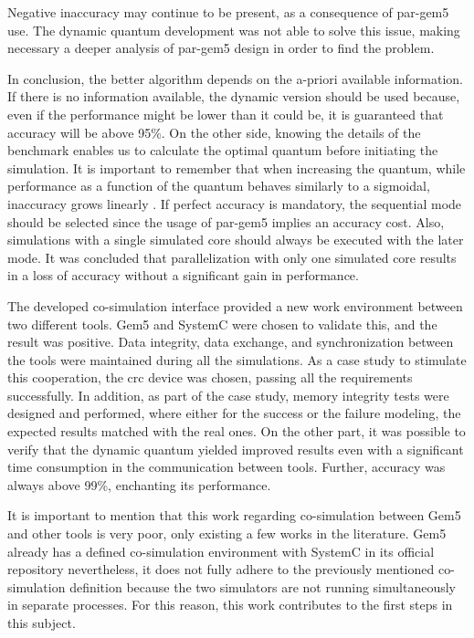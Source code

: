 Negative inaccuracy may continue to be present, as a consequence of par-gem5 use. The dynamic quantum development was not able to solve this
issue, making necessary a deeper analysis of par-gem5 design in order to find the problem. 

In conclusion, the better algorithm depends on the a-priori available information. If there is no information available, the dynamic version should be 
used because, even if the performance might be lower than it could be, it is guaranteed that accuracy will be above 95\%. On the other side,
knowing the details of the benchmark enables us to calculate the optimal quantum before initiating the simulation. It is important to 
remember that when increasing the quantum, while performance as a function of the quantum behaves similarly to a sigmoidal, inaccuracy 
grows linearly \cite*{BeyondQuantumTDSim}. If perfect accuracy is mandatory, the sequential mode should be selected since the usage of par-gem5 
implies an accuracy cost. Also, simulations with a single simulated core should always be 
executed with the later mode. It was concluded that parallelization with only one simulated core results in a loss of accuracy 
without a significant gain in performance.

The developed co-simulation interface provided a new work environment between two different tools. Gem5 and SystemC were chosen to validate 
this, and the result was positive. Data integrity, data exchange, and synchronization between the tools were maintained during all the simulations. 
As a case study to stimulate this cooperation, the \gls{crc} device was chosen, 
passing all the requirements successfully. In addition, as part of the case study, 
memory integrity tests were designed and performed, where either for the success or the failure modeling, the expected results matched
with the real ones. On the other part, it was possible to verify that the dynamic quantum yielded improved results even with a significant 
time consumption in the communication between tools. Further, accuracy was always above 99\%, enchanting its performance. 

It is important to mention that this work regarding co-simulation between Gem5 and other tools is very poor, only existing a few works in the 
literature. Gem5 already has a defined co-simulation environment with SystemC in its official repository nevertheless, it does not 
fully adhere to the previously mentioned co-simulation definition because the two simulators are not running simultaneously in separate processes.
For this reason, this work contributes to the first steps in this subject. 


